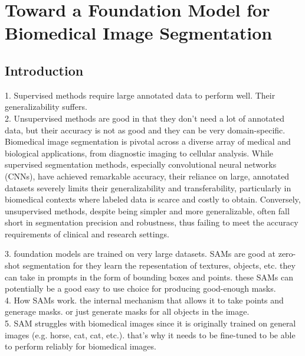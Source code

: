 \documentclass[./dissertation.tex]{subfiles}
\begin{document}
\chapter{Toward a Foundation Model for Biomedical Image Segmentation}

\section{Introduction}

1. Supervised methods require large annotated data to perform well. Their generalizability suffers. \\
2. Unsupervised methods are good in that they don't need a lot of annotated data, but their accuracy is not as good and they can be very domain-specific. \\

Biomedical image segmentation is pivotal across a diverse array of medical and biological applications, from diagnostic imaging to cellular analysis. While supervised segmentation methods, especially convolutional neural networks (CNNs), have achieved remarkable accuracy, their reliance on large, annotated datasets severely limits their generalizability and transferability, particularly in biomedical contexts where labeled data is scarce and costly to obtain. Conversely, unsupervised methods, despite being simpler and more generalizable, often fall short in segmentation precision and robustness, thus failing to meet the accuracy requirements of clinical and research settings.


3. foundation models are trained on very large datasets. SAMs are good at zero-shot segmentation for they learn the repesentation of textures, objects, etc. they can take in prompts in the form of bounding boxes and points. these SAMs can potentially be a good easy to use choice for producing good-enough masks. \\
4. How SAMs work. the internal mechanism that allows it to take points and generage masks. or just generate masks for all objects in the image. \\
5. SAM struggles with biomedical images since it is originally trained on general images (e.g. horse, cat, cat, etc.). that's why it needs to be fine-tuned to be able to perform reliably for biomedical images. \\
\end{document}
